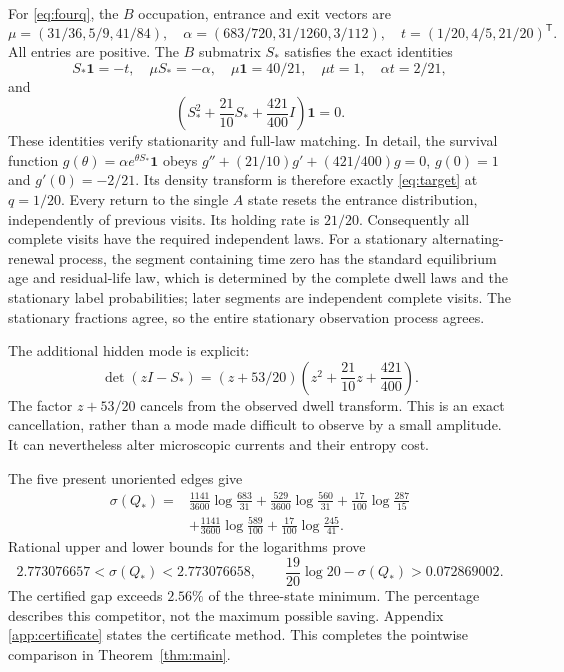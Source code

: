 \documentclass[11pt,a4paper]{article}
\theoremstyle{remark}\newtheorem{remark}[theorem]{Remark}
\newcommand{\one}{\mathbf 1}
\begin{document}
For \eqref{eq:fourq}, the $B$ occupation, entrance and exit vectors are
\begin{equation}\label{eq:fourvectors}
 \mu=(31/36,5/9,41/84),\quad
 \alpha=(683/720,31/1260,3/112),\quad
 t=(1/20,4/5,21/20)^{\mathsf T}.
\end{equation}
All entries are positive. The $B$ submatrix $S_*$ satisfies the exact identities
\begin{equation}\label{eq:fouridentities}
 S_*\one=-t,\quad \mu S_*=-\alpha,\quad
 \mu\one=40/21,\quad \mu t=1,\quad \alpha t=2/21,
\end{equation}
and
\begin{equation}\label{eq:annihilate}
 \left(S_*^2+\frac{21}{10}S_*+\frac{421}{400}I\right)\one=0.
\end{equation}
These identities verify stationarity and full-law matching. In detail, the
survival function $g(\theta)=\alpha e^{\theta S_*}\one$ obeys
$g''+(21/10)g'+(421/400)g=0$, $g(0)=1$ and $g'(0)=-2/21$.
Its density transform is therefore exactly \eqref{eq:target} at $q=1/20$.
Every return to the single $A$ state resets the entrance distribution,
independently of previous visits. Its holding rate is $21/20$.
Consequently all complete visits have the required independent laws.
For a stationary alternating-renewal process, the segment containing time
zero has the standard equilibrium age and residual-life law, which is
determined by the complete dwell laws and the stationary label
probabilities; later segments are independent complete visits. The
stationary fractions agree, so the entire stationary observation process
agrees.

The additional hidden mode is explicit:
\begin{equation}
 \det(zI-S_*)=(z+53/20)
       \left(z^2+\frac{21}{10}z+\frac{421}{400}\right).
\end{equation}
The factor $z+53/20$ cancels from the observed dwell transform. This is an
exact cancellation, rather than a mode made difficult to observe by a small
amplitude. It can nevertheless alter microscopic currents and their entropy
cost.

The five present unoriented edges give
\begin{align}\label{eq:fourentropy}
 \sigma(Q_*)={}&\frac{1141}{3600}\log\frac{683}{31}
 +\frac{529}{3600}\log\frac{560}{31}
 +\frac{17}{100}\log\frac{287}{15}\nonumber\\
 &+\frac{1141}{3600}\log\frac{589}{100}
 +\frac{17}{100}\log\frac{245}{41}.
\end{align}
Rational upper and lower bounds for the logarithms prove
\begin{equation}\label{eq:decimalcert}
 2.773076657<\sigma(Q_*)<2.773076658,
 \qquad \frac{19}{20}\log20-\sigma(Q_*)>0.072869002.
\end{equation}
The certified gap exceeds $2.56\%$ of the three-state minimum. The percentage
describes this competitor, not the maximum possible saving. Appendix
\ref{app:certificate} states the certificate method. This completes the
pointwise comparison in Theorem~\ref{thm:main}.
\end{document}
